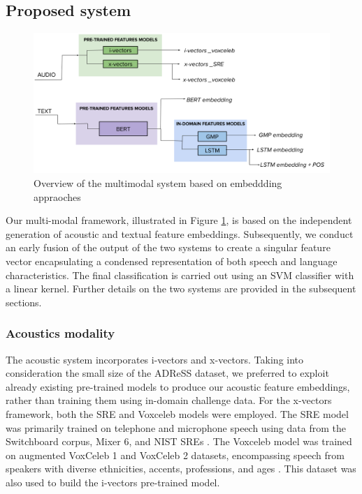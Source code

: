 \subsection{Proposed system}
\begin{figure}
  \begin{center}
  \includegraphics[scale=0.35]{imgs/ADReSS.png}  
  \caption{Overview of the multimodal system based on embeddding appraoches}
  \label{fig:adress_overview}
  \end{center}
\end{figure}
Our multi-modal framework, illustrated in Figure \ref{fig:adress_overview}, is based on the independent generation of acoustic and textual feature embeddings. Subsequently, we conduct an early fusion of the output of the two systems to create a singular feature vector encapsulating a condensed representation of both speech and language characteristics. The final classification is carried out using an SVM classifier with a linear kernel. Further details on the two systems are provided in the subsequent sections.
\subsubsection{Acoustics modality}
The acoustic system incorporates i-vectors and x-vectors. Taking into consideration the small size of the ADReSS dataset, we preferred to exploit already existing pre-trained models to produce our acoustic feature embeddings, rather than training them using in-domain challenge data. For the x-vectors framework, both the SRE and Voxceleb models were employed. The SRE model was primarily trained on telephone and microphone speech using data from the Switchboard corpus, Mixer 6, and NIST SREs \cite{snyder2018x}. The Voxceleb model was trained on augmented VoxCeleb 1 and VoxCeleb 2 datasets, encompassing speech from speakers with diverse ethnicities, accents, professions, and ages \cite{snyder2018x,nagrani17_interspeech}. This dataset was also used to build the i-vectors pre-trained model.

